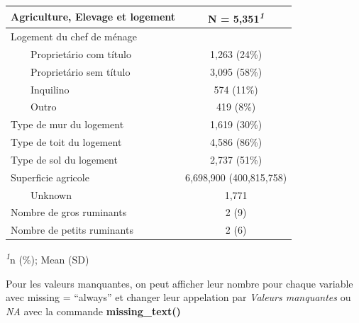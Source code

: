 \documentclass[
]{article}
\begin{document}
\begin{table}[!t]
\fontsize{12.0pt}{14.4pt}\selectfont
\begin{tabular*}{\linewidth}{@{\extracolsep{\fill}}lc}
\toprule
Agriculture, Elevage et logement & \textbf{N = 5,351}\textsuperscript{\textit{1}} \\ 
\midrule\addlinespace[2.5pt]
Logement du chef de ménage &  \\ 
    Proprietário com título & 1,263 (24\%) \\ 
    Proprietário sem título & 3,095 (58\%) \\ 
    Inquilino & 574 (11\%) \\ 
    Outro & 419 (8\%) \\ 
Type de mur du logement & 1,619 (30\%) \\ 
Type de toit du logement & 4,586 (86\%) \\ 
Type de sol du logement & 2,737 (51\%) \\ 
Superficie agricole & 6,698,900 (400,815,758) \\ 
    Unknown & 1,771 \\ 
Nombre de gros ruminants & 2 (9) \\ 
Nombre de petits ruminants & 2 (6) \\ 
\bottomrule
\end{tabular*}
\begin{minipage}{\linewidth}
\textsuperscript{\textit{1}}n (\%); Mean (SD)\\
\end{minipage}
\end{table}

Pour les valeurs manquantes, on peut afficher leur nombre pour chaque
variable avec missing = ``always'' et changer leur appelation par
\emph{Valeurs manquantes} ou \emph{NA} avec la commande
\textbf{missing\_text()}
\end{document}
